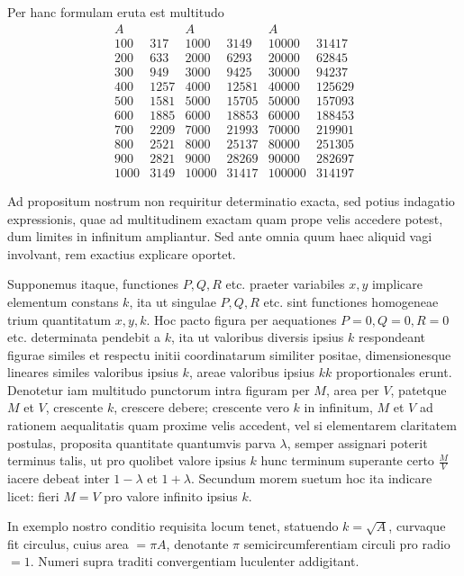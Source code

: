 %
Per hanc formulam eruta est multitudo
\[
\begin{array}{r|r||r|r||r|r}
A&&A&&A&\\\hline
100&317&1000&3149&10000&31417\\
200&633&2000&6293&20000&62845\\
300&949&3000&9425&30000&94237\\
400&1257&4000&12581&40000&125629\\
500&1581&5000&15705&50000&157093\\
600&1885&6000&18853&60000&188453\\
700&2209&7000&21993&70000&219901\\
800&2521&8000&25137&80000&251305\\
900&2821&9000&28269&90000&282697\\
1000&3149&10000&31417&100000&314197
\end{array}
\]

Ad propositum nostrum non requiritur determinatio exacta, sed potius indagatio expressionis, quae ad multitudinem exactam quam prope velis accedere potest, dum limites in infinitum ampliantur. Sed ante omnia quum haec aliquid vagi involvant, rem exactius explicare oportet.

Supponemus itaque, functiones $P,Q,R$ etc. praeter variabiles $x,y$ implicare elementum constans $k$, ita ut singulae $P,Q,R$ etc. sint functiones homogeneae trium quantitatum $x,y,k$. Hoc pacto figura per aequationes $P=0,Q=0,R=0$ etc. determinata pendebit a $k$, ita ut valoribus diversis ipsius $k$ respondeant figurae similes et respectu initii coordinatarum similiter positae, dimensionesque lineares similes valoribus ipsius $k$, areae valoribus ipsius $kk$ proportionales erunt. Denotetur iam multitudo punctorum intra figuram per $M$, area per $V$, patetque $M$ et $V$, crescente $k$, crescere debere; crescente vero $k$ in infinitum, $M$ et $V$ ad rationem aequalitatis quam proxime velis accedent, vel si elementarem claritatem postulas, proposita quantitate quantumvis parva $\lambda$, semper assignari poterit terminus talis, ut pro quolibet valore ipsius $k$ hunc terminum superante certo $\frac MV$ iacere debeat inter $1-\lambda$ et $1+\lambda$. Secundum morem suetum hoc ita indicare licet: fieri $M=V$ pro valore infinito ipsius $k$.

In exemplo nostro conditio requisita locum tenet, statuendo $k=\surd A$, curvaque fit circulus, cuius area $=\pi A$, denotante $\pi$ semicircumferentiam circuli pro radio $=1$. Numeri supra traditi convergentiam luculenter addigitant.

